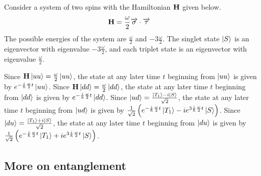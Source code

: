 \begin{answer}
	Consider a system of two spins with the Hamiltonian $\mathbf{H}$ given below.
	\begin{align}
		\mathbf{H} & = \frac{\omega}{2} \overrightarrow{\sigma} \cdot \overrightarrow{\tau}
	\end{align}
	The possible energies of the system are $\frac{\omega}{2}$ and $-3 \frac{\omega}{2}$.
	The singlet state $\ket{S}$ is an eigenvector with eigenvalue $-3 \frac{\omega}{2}$, and each triplet state is an eigenvector with eigenvalue $\frac{\omega}{2}$.

	Since $\mathbf{H} \ket{u u} = \frac{\omega}{2} \ket{u u}$, the state at any later time $t$ beginning from $\ket{u u}$ is given by $e^{-\frac{i}{\hbar} \frac{\omega}{2} t} \ket{u u}$.
	Since $\mathbf{H} \ket{d d} = \frac{\omega}{2} \ket{d d}$, the state at any later time $t$ beginning from $\ket{d d}$ is given by $e^{- \frac{i}{\hbar} \frac{\omega}{2} t} \ket{d d}$.
	Since $\ket{u d} = \frac{\ket{T_1} - i \ket{S}}{\sqrt{2}}$, the state at any later time $t$ beginning from $\ket{u d}$ is given by $\frac{1}{\sqrt{2}} \left(e^{-\frac{i}{\hbar} \frac{\omega}{2} t} \ket{T_1} - i  e^{3\frac{i}{\hbar} \frac{\omega}{2} t}\ket{S}\right)$.
	Since $\ket{d u} = \frac{\ket{T_1} + i \ket{S}}{\sqrt{2}}$, the state at any later time $t$ beginning from $\ket{d u}$ is given by $\frac{1}{\sqrt{2}} \left(e^{-\frac{i}{\hbar} \frac{\omega}{2} t} \ket{T_1} + i  e^{3\frac{i}{\hbar} \frac{\omega}{2} t}\ket{S}\right)$.
\end{answer}

\subsection{More on entanglement}

